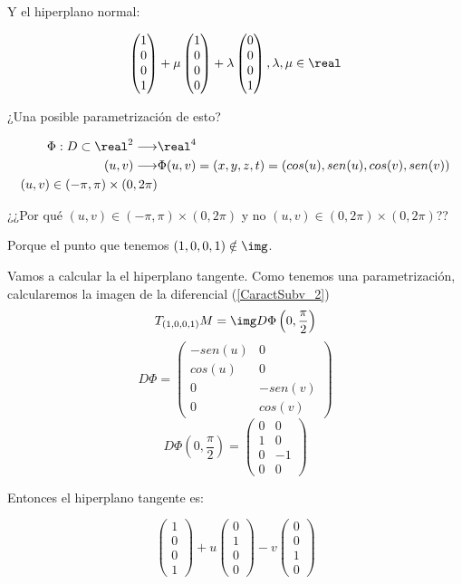 Y el hiperplano normal:

\[
\begin{pmatrix}
1\\0\\0\\1
\end{pmatrix}
+ \mu \begin{pmatrix}
1\\0 \\0\\0 	
\end{pmatrix}
+
\lambda
\begin{pmatrix}
0\\0\\0\\1
\end{pmatrix}, \lambda,\mu \in \real
\]

¿Una posible parametrización de esto?

\begin{align*}
\Phi : D \subset \real^2 \longrightarrow &\real^4\\
(u,v) \longrightarrow &\Phi(u,v) = (x,y,z,t) = \left(cos(u),sen(u),cos(v),sen(v)\right)\\
(u,v)\in (-\pi,\pi)\times(0,2\pi)
\end{align*}

¿¿Por qué $(u,v)\in (-\pi,\pi)\times(0,2\pi)$ y no $(u,v)\in (0,2\pi)\times(0,2\pi)$??

Porque el punto que tenemos $(1,0,0,1) \notin \img$. 

Vamos a calcular la el hiperplano tangente. Como tenemos una parametrización, calcularemos la imagen de la diferencial (\ref{CaractSubv_2})
\[T_{(1,0,0,1)}M = \img D\Phi\left(0,\frac{\pi}{2}\right)\]
\[D\Phi = \begin{pmatrix}
-sen(u) & 0\\
cos(u) & 0\\
0 & -sen(v)\\
0&cos(v)
\end{pmatrix}\]
\[D\Phi\left(0,\frac{\pi}{2}\right) = \begin{pmatrix}
0&0\\1&0\\0&-1\\0&0
\end{pmatrix}\]

Entonces el hiperplano tangente es:

\[\begin{pmatrix}
1\\0\\0\\1
\end{pmatrix} + u \begin{pmatrix}
0\\1\\0\\0
\end{pmatrix}
- v \begin{pmatrix}
0\\0\\1\\0
\end{pmatrix}
\]

